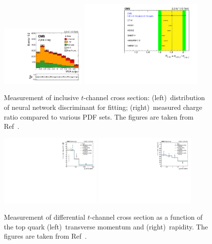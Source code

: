 \documentclass[12pt]{article}
\begin{document}
\begin{figure}[!htb]
\begin{center}
\includegraphics[width=0.38\textwidth]{tch-nn.pdf}\hspace{0.02\textwidth}
\includegraphics[width=0.55\textwidth]{tch-ratio.pdf}
\caption{Measurement of inclusive $t$-channel cross section: (left)~distribution of neural network discriminant for fitting; (right)~measured charge ratio compared to various PDF sets. The figures are taken from Ref~\cite{tchannel-inc}.}
\end{center}
\end{figure}


\begin{figure}[!htb]
\begin{center}
\includegraphics[width=0.45\textwidth]{unfolded_top_pt.pdf}\hspace{0.02\textwidth}
\includegraphics[width=0.45\textwidth]{unfolded_top_y.pdf}
\caption{Measurement of differential $t$-channel cross section as a function of the top quark (left)~transverse momentum and (right)~rapidity. The figures are taken from Ref~\cite{tchannel-diff}.}
\end{center}
\end{figure}
\end{document}

